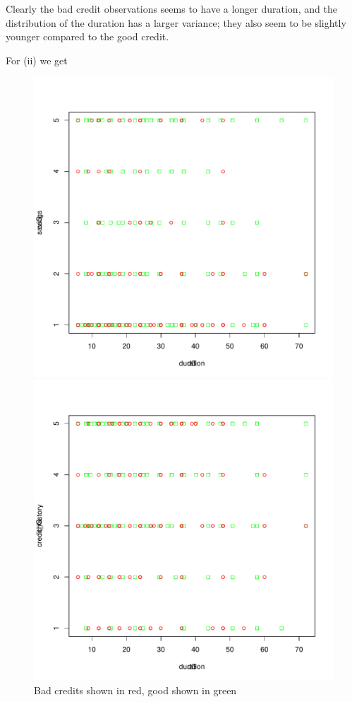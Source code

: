 \documentclass[11pt]{article}
\begin{document}
\begin{enumerate}
  Clearly the bad credit observations seems to have a longer duration, and the distribution of the duration has a larger variance; they also seem to be slightly younger compared to the good credit.

  For (ii) we get
  \begin{figure}[htb]
  \caption{Bad credits shown in red, good shown in green}
  \begin{minipage}{0.48\linewidth}
  \includegraphics[scale=0.4]{dur-sav.pdf}
\end{minipage}
\begin{minipage}{0.48\linewidth}
  \includegraphics[scale=0.4]{dur-credh.pdf}
  \end{minipage}
  \end{figure}


\end{enumerate}
\end{document}

